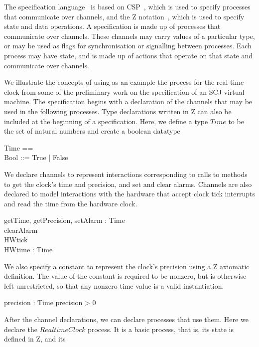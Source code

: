 \documentclass[a4paper,10pt]{report}
\begin{document}
The \Circus{} specification language~\cite{oliveira2009} is based on
CSP~\cite{roscoe2011}, which is used to specify processes that
communicate over channels, and the Z notation~\cite{woodcock1996},
which is used to specify state and data operations.
A \Circus{} specification is made up of processes that communicate
over channels.
These channels may carry values of a particular type, or may be used
as flags for synchronisation or signalling between processes.
Each process may have state, and is made up of actions that operate on
that state and communicate over channels.

We illustrate the concepts of \Circus{} using as an example the
process for the real-time clock from some of the preliminary work on
the specification of an SCJ virtual machine.
The specification begins with a declaration of the channels that may
be used in the following processes.
Type declarations written in Z can also be included at the beginning
of a \Circus{} specification.
Here, we define a type $Time$ to be the set of natural numbers and
create a boolean datatype
%
\begin{zed}
  Time == \nat \\
  Bool ::= True | False \\
\end{zed}
%
We declare channels to represent interactions corresponding to calls
to methods to get the clock's time and precision, and set and clear
alarms.
Channels are also declared to model interactions with the hardware
that accept clock tick interrupts and read the time from the hardware
clock.
%
\begin{circus}
  \circchannel getTime, getPrecision, setAlarm : Time \\
  \circchannel clearAlarm \\
  \circchannel HWtick \\
  \circchannel HWtime : Time \\
\end{circus}
%
We also specify a constant to represent the clock's precision using a
Z axiomatic definition.
The value of the constant is required to be nonzero, but is otherwise
left unrestricted, so that any nonzero time value is a valid
instantiation.
%
\begin{axdef}
  precision : Time \where precision > 0
\end{axdef}
%
After the channel declarations, we can declare processes that use
them.
Here we declare the $RealtimeClock$ process.
It is a basic process, that is, its state is defined in Z, and its
\end{document}
